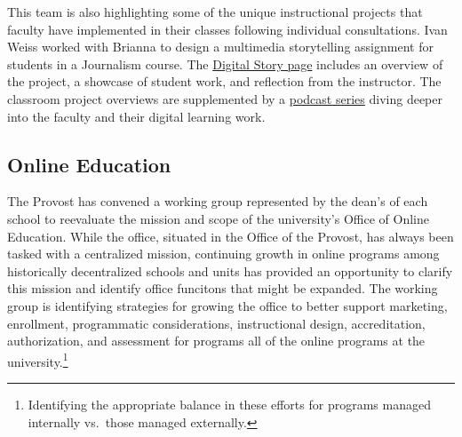 \documentclass[]{tufte-handout}
\begin{document}
This team is also highlighting some of the unique instructional projects
that faculty have implemented in their classes following individual
consultations. Ivan Weiss worked with Brianna to design a multimedia
storytelling assignment for students in a Journalism course. The
\href{https://is.wfu.edu/academic-technologies/story/journalism-multimedia-storytelling/}{Digital
Story page} includes an overview of the project, a showcase of student
work, and reflection from the instructor. The classroom project
overviews are supplemented by a
\href{https://is.wfu.edu/academic-technologies/podcasts/}{podcast
series} diving deeper into the faculty and their digital learning work.

\subsection{Online Education}\label{online-education}

The Provost has convened a working group represented by the dean's of
each school to reevaluate the mission and scope of the university's
Office of Online Education. While the office, situated in the Office of
the Provost, has always been tasked with a centralized mission,
continuing growth in online programs among historically decentralized
schools and units has provided an opportunity to clarify this mission
and identify office funcitons that might be expanded. The working group
is identifying strategies for growing the office to better support
marketing, enrollment, programmatic considerations, instructional
design, accreditation, authorization, and assessment for programs all of
the online programs at the university.\footnote{Identifying the
  appropriate balance in these efforts for programs managed internally
  vs.~those managed externally.}
\end{document}
